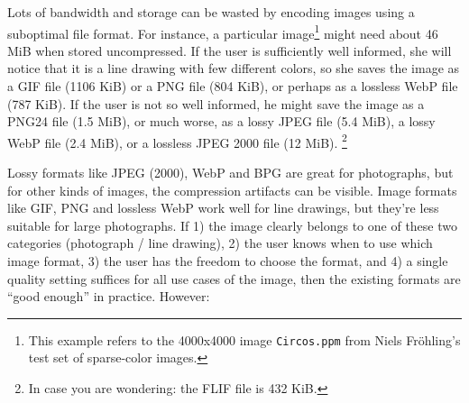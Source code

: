 \documentclass{article}
\begin{document}
Lots of bandwidth and storage can be wasted by encoding images using a suboptimal file format.
For instance, a particular
image\footnote{This example refers to the 4000x4000 image {\tt Circos.ppm} from Niels Fr\"ohling's test set of sparse-color images.}
might need about 46 MiB when stored uncompressed.
If the user is sufficiently well informed, she will notice
that it is a line drawing with few different colors, %
so she saves the image as a GIF file (1106 KiB) or a PNG file (804 KiB),
or perhaps as a lossless WebP file (787 KiB).
If the user is not so well informed, he might save the image as a PNG24 file
(1.5 MiB), or much worse, as a lossy JPEG file (5.4 MiB), a lossy WebP file
(2.4 MiB), or a lossless JPEG 2000 file (12 MiB).%
\footnote{In case you are wondering: the FLIF file is 432 KiB.}

Lossy formats like JPEG (2000), WebP and BPG %
are great for photographs, but for other kinds of images,
the compression artifacts can be visible.
Image formats like GIF, PNG and lossless WebP work well for line drawings,
but they're less suitable for large photographs.
%
If 1) the image clearly belongs to one of these two categories (photograph / line drawing),
2) the user knows when to use which image format, %
3) the user has the freedom to choose the format,
and 4) a single quality setting suffices for all use cases of the image,
then the existing formats are ``good enough'' in practice. However: %
\end{document}
